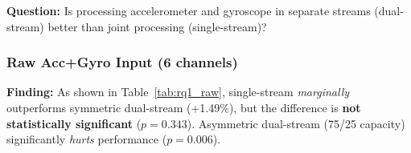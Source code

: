 \documentclass{article}
\begin{document}
\textbf{Question:} Is processing accelerometer and gyroscope in separate streams (dual-stream) better than joint processing (single-stream)?

\subsubsection{Raw Acc+Gyro Input (6 channels)}

\begin{table}[htbp]
    \centering
    \caption{Single vs Dual-Stream comparison: Raw acc+gyro input, Young+Old population (22-fold LOSO). All values in [\%], $\pm$ std.}
    \label{tab:rq1_raw}
    \small
\end{table}

\textbf{Finding:} As shown in Table~\ref{tab:rq1_raw}, single-stream \textit{marginally} outperforms symmetric dual-stream (+1.49\%), but the difference is \textbf{not statistically significant} ($p = 0.343$). Asymmetric dual-stream (75/25 capacity) significantly \textit{hurts} performance ($p = 0.006$).
\end{document}
